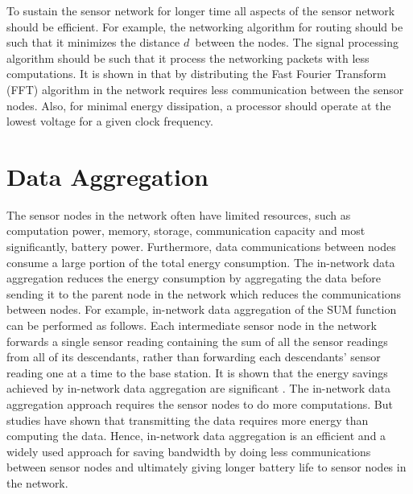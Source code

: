  	To sustain the sensor network for longer time all aspects of the sensor network should be efficient.
	For example, the networking algorithm for routing should be such that it minimizes the distance $d$\ between the nodes.
	The signal processing algorithm should be such that it process the networking packets with less computations.
	It is shown in \cite{wang2002energy} that by distributing the Fast Fourier Transform (FFT) algorithm in the network requires less communication between the sensor nodes.
	Also, for minimal energy dissipation, a processor should operate at the lowest voltage for a given clock frequency.

\section{Data Aggregation}
	The sensor nodes in the network often have limited resources, such as computation power, memory, storage, communication capacity and most significantly, battery power.
	Furthermore, data communications between nodes consume a large portion of the total energy consumption. 
	The in-network data aggregation reduces the energy consumption by aggregating the data before sending it to the parent node in the network which reduces the communications between nodes.
	For example, in-network data aggregation of the SUM function can be performed as follows. 
	Each intermediate sensor node in the network forwards a single sensor reading containing the sum of all the sensor readings from all of its descendants, rather than forwarding each descendants' sensor reading one at a time to the base station.
	It is shown that the energy savings achieved by in-network data aggregation are significant \cite{madden2002tag}.
	The in-network data aggregation approach requires the sensor nodes to do more computations.
	But studies have shown that transmitting the data requires more energy than computing the data. 
	Hence, in-network data aggregation is an efficient and a widely used approach for saving bandwidth by doing less communications between sensor nodes and ultimately giving longer battery life to sensor nodes in the network.

